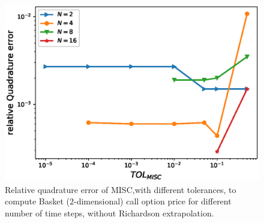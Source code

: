 \FloatBarrier
	\begin{figure}[h!]
	\centering
	\includegraphics[width=0.4\linewidth]{./figures/Basket_2d_MISC_quadrature_error/relative_quad_error_wrt_MISC_TOL_non_rich}
	
	
	\caption{Relative quadrature error of MISC,with different tolerances,  to compute Basket ($2$-dimensional) call option price for different number of time steps, without Richardson extrapolation.}
	\label{fig:Quadrature_error_non_rich_basket_Call}
\end{figure}

\FloatBarrier

